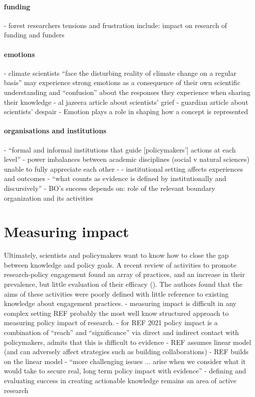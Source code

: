 \paragraph{funding}
\cite{OjanenBKP2021} - forest researchers tensions and frustration include: impact on research of funding and funders
\paragraph{emotions}
\cite{RandallH2019} - climate scientists ``face the disturbing reality of climate change on a regular basis'' may experience strong emotions as a consequence of their own scientific understanding and ``confusion'' about the responses they experience when sharing their knowledge
\cite{Pivovarchuk2024} - al jazeera article about scientists' grief
\cite{Carrington2024} - guardian article about scientists' despair
\cite{Makin2024} - Emotion plays a role in shaping how a concept is represented
\paragraph{organisations and institutions}
\cite{CairneyW2017} - ``formal and informal institutions that guide [policymakers'] actions at each level''
\cite{BalvaneraJNOBCDGGKKMPSSW2020} - power imbalances between academic disciplines (social v natural sciences) unable to fully appreciate each other
\cite{GeuijenMCRv2017} - 
\cite{SaxonbergSL2023} - institutional setting affects experiences and outcomes
\cite{StrassheimK2014} - ``what counts as evidence is defined by institutionally and discursively''
\cite{WesselinkH2020} - BO's success depends on: role of the relevant boundary organization and its activities


\section{Measuring impact}
Ultimately, scientists and policymakers want to know how to close the gap between knowledge and policy goals. A recent review of activities to promote research-policy engagement found an array of practices, and an increase in their prevalence, but little evaluation of their efficacy (\cite{OliverHBGC2022}). The authors found that the aims of these activities were poorly defined with little reference to existing knowledge about engagement practices.  
\cite{BednarekSHG2015} - measuring impact is difficult in any complex setting
REF probably the most well know structured approach to measuring policy impact of research.
\cite{KEU2021impact} - for REF 2021 policy impact is a combination of ``reach'' and ``significance'' via direct and indirect contact with policymakers, admits that this is difficult to evidence
\cite{BoswellS2017} - REF assumes linear model (and can adversely affect strategies such as building collaborations)
\cite{Cairney2018} - REF builds on the linear model
\cite{CairneyO2020} - ``more challenging issues ... arise when we consider what it would take to secure real, long term policy impact with evidence''
\cite{JagannathanEtAl2023} - defining and evaluating success in creating actionable knowledge remains an area of active research

